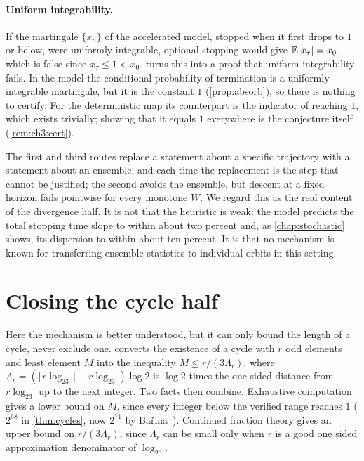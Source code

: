 \paragraph{Uniform integrability.} If the martingale $\{x_n\}$ of the
accelerated model, stopped when it first drops to $1$ or below, were uniformly integrable, optional stopping would give
$\mathbb{E}[x_\tau]=x_0$, which is false since $x_\tau\le1<x_0$. 
turns this into a proof that uniform integrability fails. In the model the
conditional probability of termination is a uniformly integrable martingale,
but it is the constant $1$ (\cref{prop:absorb}), so there is nothing to
certify. For the deterministic map its counterpart is the indicator of
reaching $1$, which exists trivially; showing that it equals $1$ everywhere is
the conjecture itself (\cref{rem:ch3:cert}).

The first and third routes replace a statement about
a specific trajectory with a statement about an ensemble, and each time the
replacement is the step that cannot be justified; the second avoids the
ensemble, but descent at a fixed horizon fails pointwise for every monotone
$W$. We regard this as the real content of the divergence half. It is not that the heuristic is weak: the model
predicts the total stopping time slope to within about two percent and, as
\cref{chap:stochastic} shows, its dispersion to within about ten percent. It is that no mechanism
is known for transferring ensemble statistics to individual orbits in this
setting.

\section{Closing the cycle half}\label{sec:ch10:cycles}

Here the mechanism is better understood, but it can only bound the length of a
cycle, never exclude one.  converts the existence of a cycle
with $r$ odd elements and least element $M$ into the inequality
$M\le r/(3\Lambda_r)$, where $\Lambda_r=(\lceil r\log_23\rceil-r\log_23)\log2$
is $\log2$ times the one sided distance from $r\log_23$ up to the next integer. Two facts then
combine. Exhaustive computation gives a lower bound on $M$, since every integer
below the verified range reaches $1$ ($2^{68}$ in \cref{thm:cycles}, now
$2^{71}$ by Ba\v{r}ina~\cite{barina2025}). Continued fraction theory gives
an upper bound on $r/(3\Lambda_r)$, since $\Lambda_r$ can be small only when $r$
is a good one sided approximation denominator of $\log_23$.

